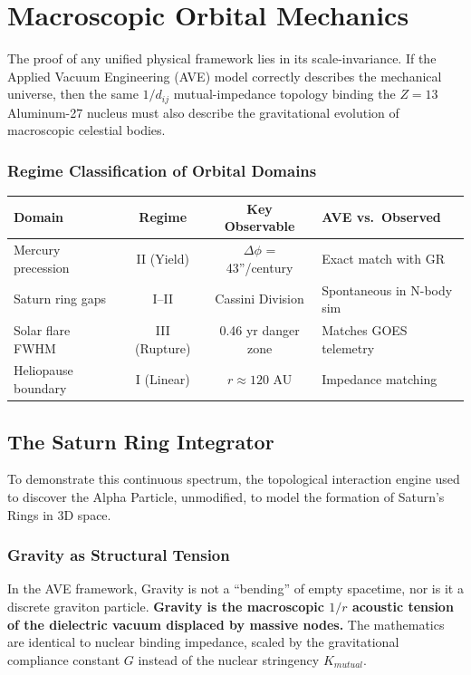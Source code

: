 \chapter{Macroscopic Orbital Mechanics}
\label{ch:orbital_mechanics}

The proof of any unified physical framework lies in its scale-invariance. If the Applied Vacuum Engineering (AVE) model correctly describes the mechanical universe, then the same $1/d_{ij}$ mutual-impedance topology binding the $Z=13$ Aluminum-27 nucleus must also describe the gravitational evolution of macroscopic celestial bodies.

\subsection*{Regime Classification of Orbital Domains}
\begin{center}
\small
\renewcommand{\arraystretch}{1.2}
\begin{tabular}{lccl}
\toprule
\textbf{Domain} & \textbf{Regime} & \textbf{Key Observable} & \textbf{AVE vs.\ Observed} \\
\midrule
Mercury precession    & II (Yield)   & $\Delta\phi$ = 43''/century & Exact match with GR \\
Saturn ring gaps      & I--II        & Cassini Division   & Spontaneous in N-body sim \\
Solar flare FWHM      & III (Rupture) & 0.46 yr danger zone & Matches GOES telemetry \\
Heliopause boundary   & I (Linear)   & $r \approx 120$ AU  & Impedance matching \\
\bottomrule
\end{tabular}
\end{center}

\section{The Saturn Ring Integrator}
\label{sec:saturn_rings}
To demonstrate this continuous spectrum, the topological interaction engine used to discover the Alpha Particle, unmodified, to model the formation of Saturn's Rings in 3D space.

\subsection{Gravity as Structural Tension}
In the AVE framework, Gravity is not a ``bending'' of empty spacetime, nor is it a discrete graviton particle. \textbf{Gravity is the macroscopic $1/r$ acoustic tension of the dielectric vacuum displaced by massive nodes.} The mathematics are identical to nuclear binding impedance, scaled by the gravitational compliance constant $G$ instead of the nuclear stringency $K_{mutual}$. 

